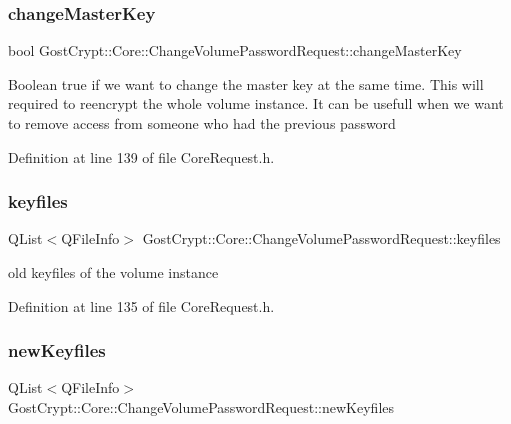 \subsubsection{\texorpdfstring{change\+Master\+Key}{changeMasterKey}}
{\footnotesize\ttfamily bool Gost\+Crypt\+::\+Core\+::\+Change\+Volume\+Password\+Request\+::change\+Master\+Key}

Boolean true if we want to change the master key at the same time. This will required to reencrypt the whole volume instance. It can be usefull when we want to remove access from someone who had the previous password 

Definition at line 139 of file Core\+Request.\+h.

\mbox{\label{struct_gost_crypt_1_1_core_1_1_change_volume_password_request_a48d16f1fb625a533786ecb74e7c62222}} 
\subsubsection{\texorpdfstring{keyfiles}{keyfiles}}
{\footnotesize\ttfamily Q\+List$<$Q\+File\+Info$>$ Gost\+Crypt\+::\+Core\+::\+Change\+Volume\+Password\+Request\+::keyfiles}

old keyfiles of the volume instance 

Definition at line 135 of file Core\+Request.\+h.

\mbox{\label{struct_gost_crypt_1_1_core_1_1_change_volume_password_request_a8e3120235c60e7eb2849b7f47bb39358}} 
\subsubsection{\texorpdfstring{new\+Keyfiles}{newKeyfiles}}
{\footnotesize\ttfamily Q\+List$<$Q\+File\+Info$>$ Gost\+Crypt\+::\+Core\+::\+Change\+Volume\+Password\+Request\+::new\+Keyfiles}

